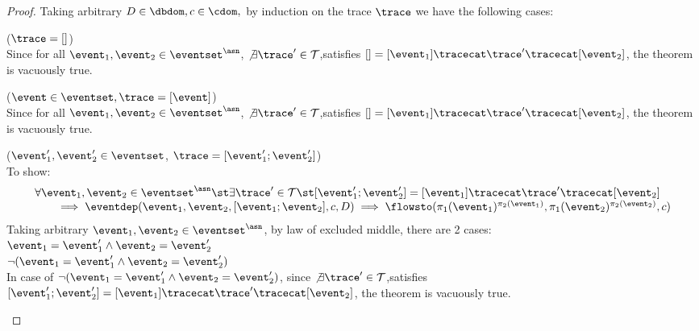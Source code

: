 \begin{proof}
  Taking arbitrary $D \in \dbdom , c \in \cdom,$ by induction on the trace $\trace$ we have the following cases:
  \begin{case}($\trace = {[]}$)
    \\
    Since for all $\event_1, \event_2 \in \eventset^{\asn}$,
     $\not\exists \trace' \in \mathcal{T}$,satisfies $
    {[]}  = [\event_1] \tracecat \trace' \tracecat [\event_2]$, the theorem is vacuously true.
    \end{case}
    \begin{case}($\event \in \eventset, \trace = [\event]$)
    \\
    Since for all $\event_1, \event_2 \in \eventset^{\asn}$,
     $\not\exists \trace' \in \mathcal{T}$,satisfies $
    {[]} = [\event_1] \tracecat \trace' \tracecat [\event_2]$, the theorem is vacuously true.
    \end{case}
    \begin{case}
      \label{case:soundness_basecase}
      ($\event_1', \event_2' \in \eventset $, $\trace = [\event_1'; \event_2']$)
      \\
      To show:
      \[
      \begin{array}{l}
        \forall \event_1, \event_2 \in \eventset^{\asn} \st
        \exists \trace' \in \mathcal{T} \st [\event_1'; \event_2'] = [\event_1] \tracecat \trace' \tracecat [\event_2]
        \\ \qquad 
            \implies    
          \eventdep(\event_1, \event_2, [\event_1; \event_2], c, D)
         \implies \flowsto(\pi_1(\event_1)^{\pi_2(\event_1)}, \pi_1(\event_2)^{\pi_2(\event_2)}, c)
      \end{array}
      \]
      Taking arbitrary $ \event_1, \event_2 \in \eventset^{\asn}$, by law of excluded middle, there are 2 cases:
      \\
      $\event_1 = \event_1' \land  \event_2 = \event_2'$
      \\
      $\neg(\event_1 = \event_1' \land  \event_2 = \event_2')$
      \\
      In case of $\neg(\event_1 = \event_1' \land  \event_2 = \event_2')$, since 
      $\not\exists \trace' \in \mathcal{T}$,satisfies $
      [\event_1'; \event_2'] = [\event_1] \tracecat \trace' \tracecat [\event_2]$, 
      the theorem is vacuously true.

\end{case}
\end{proof}
